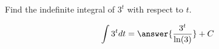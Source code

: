 \documentclass{ximera}
\author{Gregory Hartman \and Matthew Carr\and Nela Lakos}
\begin{document}
\begin{exercise}


Find the indefinite integral of $3^t$ with respect to $t$.

\[
\int 3^{t} dt=\answer{\frac{3^{t}}{\ln(3)}}+C
\]


\end{exercise}
\end{document}

